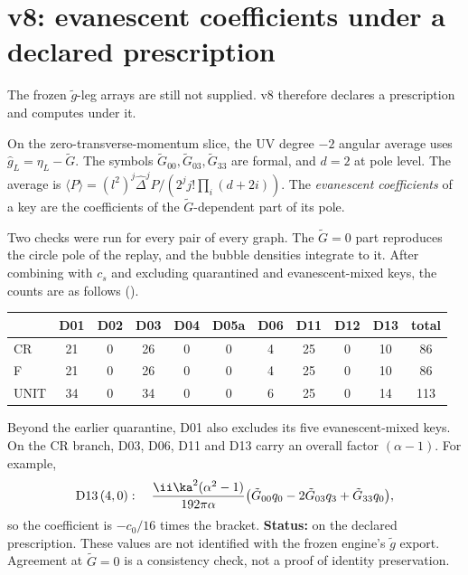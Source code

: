 
\section{v8: evanescent coefficients under a declared prescription}
\label{sec:v8evan}

The frozen \(\tilde g\)-leg arrays are still not supplied. v8
therefore declares a prescription and computes under it.

\begin{definition}
On the zero-transverse-momentum slice, the UV degree \(-2\) angular
average uses \(\hat g_L=\eta_L-\tilde G\). The symbols
\(\tilde G_{00},\tilde G_{03},\tilde G_{33}\) are formal, and
\(d=2\) at pole level. The average is
\(\langle P\rangle=(l^2)^j\hat\Delta^jP/(2^jj!\prod_i(d+2i))\).
The \emph{evanescent coefficients} of a key are the coefficients of
the \(\tilde G\)-dependent part of its pole.
\end{definition}

Two checks were run for every pair of every graph. The
\(\tilde G=0\) part reproduces the circle pole of the replay, and
the bubble densities integrate to it.
After combining with \(c_s\) and excluding quarantined and
evanescent-mixed keys, the counts are as follows
().
\begin{center}
\small
\begin{tabular}{@{}lccccccccc|c@{}}
\toprule
 & D01 & D02 & D03 & D04 & D05a & D06 & D11 & D12 & D13 & total\\
\midrule
CR & 21 & 0 & 26 & 0 & 0 & 4 & 25 & 0 & 10 & 86\\
F & 21 & 0 & 26 & 0 & 0 & 4 & 25 & 0 & 10 & 86\\
UNIT & 34 & 0 & 34 & 0 & 0 & 6 & 25 & 0 & 14 & 113\\
\bottomrule
\end{tabular}
\end{center}
Beyond the earlier quarantine, D01 also excludes its five
evanescent-mixed keys. On the CR branch, D03, D06, D11 and D13
carry an overall factor \((\alpha-1)\). For example,
\[
 \text{D13}\,(4,0):\quad
 \frac{\ii\ka^2(\alpha^2-1)}{192\pi\alpha}
 \bigl(\tilde G_{00}q_0-2\tilde G_{03}q_3+\tilde G_{33}q_0\bigr),
\]
so the coefficient is \(-c_0/16\) times the bracket.
\textbf{Status:} \CONDITIONAL{} on the declared prescription. These
values are not identified with the frozen engine's \(\tilde g\)
export. Agreement at \(\tilde G=0\) is a consistency check, not a
proof of identity preservation.

